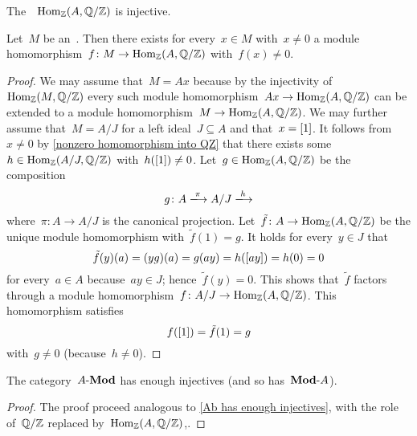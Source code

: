 \begin{example}
  The~{}~$\operatorname{Hom}_{\mathbb{Z}}(A, \mathbb{Q}/\mathbb{Z})$ is injective.
\end{example}


\begin{lemma*}
  Let~$M$ be an~{}.
  Then there exists for every~$x \in M$ with~$x \neq 0$ a module homomorphism~$f \colon M \to \operatorname{Hom}_{\mathbb{Z}}(A, \mathbb{Q}/\mathbb{Z})$ with~$f(x) \neq 0$.
\end{lemma*}


\begin{proof}
  We may assume that~$M = A x$ because by the injectivity of~$\operatorname{Hom}_{\mathbb{Z}}(M, \mathbb{Q}/\mathbb{Z})$ every such module homomorphism~$Ax \to \operatorname{Hom}_{\mathbb{Z}}(A, \mathbb{Q}/\mathbb{Z})$ can be extended to a module homomorphism~$M \to \operatorname{Hom}_{\mathbb{Z}}(A, \mathbb{Q}/\mathbb{Z})$.
  We may further assume that~$M = A/J$ for a left ideal~$J \subseteq A$ and that~$x = [1]$.
  It follows from~$x \neq 0$ by \cref{nonzero homomorphism into QZ} that there exists some~$h \in \operatorname{Hom}_{\mathbb{Z}}(A/J, \mathbb{Q}/\mathbb{Z})$ with~$h([1]) \neq 0$.
  Let~$g \in \operatorname{Hom}_{\mathbb{Z}}(A, \mathbb{Q}/\mathbb{Z})$ be the composition
  \[
    g
    \colon
    A
    \xlongto{\pi}
    A/J
    \xlongto{h}
  \]
  where~$\pi \colon A \to A/J$ is the canonical projection.
  Let~$\tilde{f} \colon A \to \operatorname{Hom}_{\mathbb{Z}}(A, \mathbb{Q}/\mathbb{Z})$ be the unique module homomorphism with~$\tilde{f}(1) = g$.
  It holds for every~$y \in J$ that
  \[
    \tilde{f}(y)(a)
    =
    (y g)(a)
    =
    g(ay)
    =
    h([ay])
    =
    h(0)
    =
    0
  \]
  for every~$a \in A$ because~$ay \in J$;
  hence~$\tilde{f}(y) = 0$.
  This shows that~$\tilde{f}$ factors through a {\welldef} module homomorphism~$f \colon A/J \to \operatorname{Hom}_{\mathbb{Z}}(A, \mathbb{Q}/\mathbb{Z})$.
  This homomorphism satisfies
  \[
    f([1])
    =
    \tilde{f}(1)
    =
    g
  \]
  with~$g \neq 0$ (because~$h \neq 0$).
\end{proof}


\begin{corollary}
  The category~$\text{$A$-$\mathbf{Mod}$}$ has enough injectives (and so has~$\text{$\mathbf{Mod}$-$A$}$).
\end{corollary}


\begin{proof}
    The proof proceed analogous to \cref{Ab has enough injectives}, with the role of~$\mathbb{Q}/\mathbb{Z}$ replaced by~$\operatorname{Hom}_{\mathbb{Z}}(A, \mathbb{Q}/\mathbb{Z})$,.
\end{proof}







